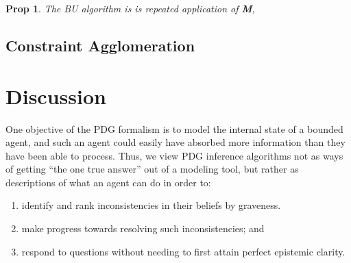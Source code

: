 \documentclass{article}
\theoremstyle{plain}
\newtheorem{prop}[theorem]{Prop}
\theoremstyle{definition}
\theoremstyle{remark}
\begin{document}
\begin{prop}
	The BU algorithm is is repeated application of \textbf{M},
\end{prop}

\subsection{Constraint Agglomeration}


\section{Discussion}

%
%
One objective of the PDG formalism is to model the internal state of a bounded agent, and such an agent could easily have absorbed more information than they have been able to process.
Thus, we view PDG inference algorithms not as ways of getting ``the one true answer'' out of a modeling tool, but rather as descriptions of what an agent can do in order to:
\begin{enumerate}[nosep]
	\item identify and rank inconsistencies in their beliefs by graveness.
	\item make progress towards resolving such inconsistencies; and
	\item respond to questions without needing to first attain perfect epistemic clarity.
\end{enumerate}



\clearpage
\appendix
\end{document}
